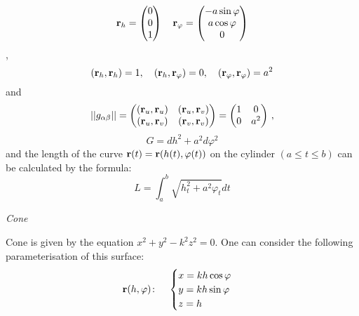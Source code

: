 \documentclass[12pt]{article}
\theoremstyle{theorem}
\numberwithin{equation}{section}
\begin{document}
  \begin{equation}\label{cyl1}
  {\bf r}_h=\begin{pmatrix}
        0\\
        0\\
        1\\
   \end{pmatrix}
\quad
  {\bf r}_\varphi=\begin{pmatrix}
        -a\sin\varphi\\
        a\cos\varphi\\
          0\\
   \end{pmatrix}
 \end{equation},
            $$
     ({\bf r}_h,{\bf r}_h)=1,\quad
     ({\bf r}_h,{\bf r}_\varphi)=0,\quad
     ({\bf r}_\varphi,{\bf r}_\varphi)=a^2
            $$
and
\begin{equation*}\label{formula forfirstformcyl}
||g_{\alpha\beta}||=
   \begin{pmatrix}
   ({\bf r}_u,{\bf r}_u) & ({\bf r}_u,{\bf r}_v) \\
   ({\bf r}_u,{\bf r}_v) & ({\bf r}_v,{\bf r}_v) \\
   \end{pmatrix}=   \begin{pmatrix}
   1 & 0 \\
   0& a^2 \\
   \end{pmatrix}\,,
\end{equation*}
\begin{equation}\label{formula forfirstformcyl}
   G=dh^2+a^2d\varphi^2
\end{equation}
  and the length of the curve ${\bf r}(t)={\bf r} (h(t), \varphi(t))$ on the cylinder
    $(a\leq t\leq b)$
  can be calculated by the formula:
               \begin{equation}
             L=
             \int_a^b\sqrt{h_t^2+a^2\varphi_t}dt
               \end{equation}



\medskip

  \centerline {\it Cone}
 Cone is given by the equation $x^2+y^2-k^2z^2=0$. One can consider the following
parameterisation
 of this surface:
\begin{equation}\label{surfacecone}
  {\bf r}(h,\varphi)\colon\quad
  \begin{cases}
  x=kh\cos\varphi\\
  y=kh\sin\varphi\\
  z=h\\
  \end{cases}
\end{equation}
\end{document}
